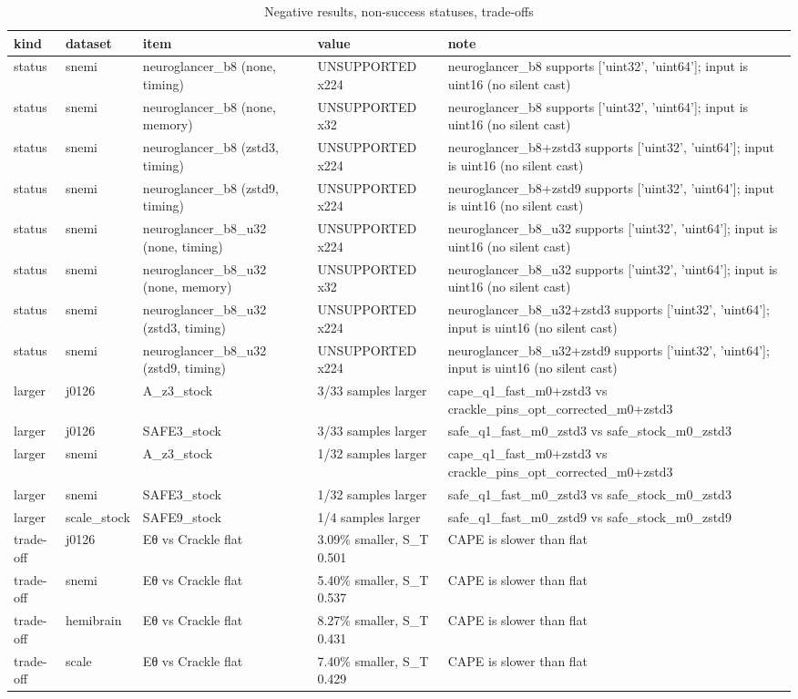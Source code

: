 \begin{table}[t]\centering\scriptsize
\caption{Negative results, non-success statuses, trade-offs}\label{tab:T08}
\begin{tabular}{lllll}
\hline
kind & dataset & item & value & note \\ \hline
status & snemi & neuroglancer\_b8 (none, timing) & UNSUPPORTED x224 & neuroglancer\_b8 supports ['uint32', 'uint64']; input is uint16 (no silent cast) \\
status & snemi & neuroglancer\_b8 (none, memory) & UNSUPPORTED x32 & neuroglancer\_b8 supports ['uint32', 'uint64']; input is uint16 (no silent cast) \\
status & snemi & neuroglancer\_b8 (zstd3, timing) & UNSUPPORTED x224 & neuroglancer\_b8+zstd3 supports ['uint32', 'uint64']; input is uint16 (no silent cast) \\
status & snemi & neuroglancer\_b8 (zstd9, timing) & UNSUPPORTED x224 & neuroglancer\_b8+zstd9 supports ['uint32', 'uint64']; input is uint16 (no silent cast) \\
status & snemi & neuroglancer\_b8\_u32 (none, timing) & UNSUPPORTED x224 & neuroglancer\_b8\_u32 supports ['uint32', 'uint64']; input is uint16 (no silent cast) \\
status & snemi & neuroglancer\_b8\_u32 (none, memory) & UNSUPPORTED x32 & neuroglancer\_b8\_u32 supports ['uint32', 'uint64']; input is uint16 (no silent cast) \\
status & snemi & neuroglancer\_b8\_u32 (zstd3, timing) & UNSUPPORTED x224 & neuroglancer\_b8\_u32+zstd3 supports ['uint32', 'uint64']; input is uint16 (no silent cast) \\
status & snemi & neuroglancer\_b8\_u32 (zstd9, timing) & UNSUPPORTED x224 & neuroglancer\_b8\_u32+zstd9 supports ['uint32', 'uint64']; input is uint16 (no silent cast) \\
larger & j0126 & A\_z3\_stock & 3/33 samples larger & cape\_q1\_fast\_m0+zstd3 vs crackle\_pins\_opt\_corrected\_m0+zstd3 \\
larger & j0126 & SAFE3\_stock & 3/33 samples larger & safe\_q1\_fast\_m0\_zstd3 vs safe\_stock\_m0\_zstd3 \\
larger & snemi & A\_z3\_stock & 1/32 samples larger & cape\_q1\_fast\_m0+zstd3 vs crackle\_pins\_opt\_corrected\_m0+zstd3 \\
larger & snemi & SAFE3\_stock & 1/32 samples larger & safe\_q1\_fast\_m0\_zstd3 vs safe\_stock\_m0\_zstd3 \\
larger & scale\_stock & SAFE9\_stock & 1/4 samples larger & safe\_q1\_fast\_m0\_zstd9 vs safe\_stock\_m0\_zstd9 \\
trade-off & j0126 & Eθ vs Crackle flat & 3.09\% smaller, S\_T 0.501 & CAPE is slower than flat \\
trade-off & snemi & Eθ vs Crackle flat & 5.40\% smaller, S\_T 0.537 & CAPE is slower than flat \\
trade-off & hemibrain & Eθ vs Crackle flat & 8.27\% smaller, S\_T 0.431 & CAPE is slower than flat \\
trade-off & scale & Eθ vs Crackle flat & 7.40\% smaller, S\_T 0.429 & CAPE is slower than flat \\
\hline
\end{tabular}
\end{table}
